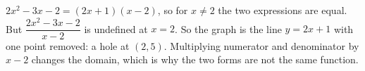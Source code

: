 $2x^2-3x-2=(2x+1)(x-2)$, so for $x\ne2$ the two expressions are equal. But $\dfrac{2x^2-3x-2}{x-2}$ is undefined at $x=2$. So the graph is the line $y=2x+1$ with one point removed: a hole at $\boxed{(2,5)}$. Multiplying numerator and denominator by $x-2$ changes the domain, which is why the two forms are not the same function.
